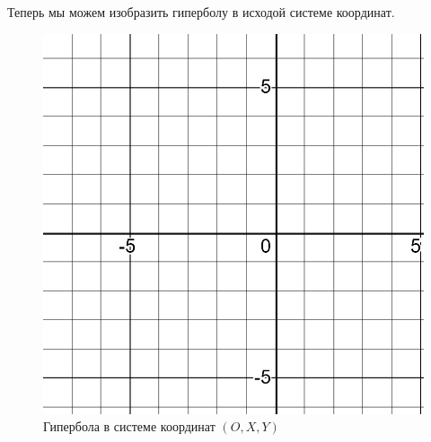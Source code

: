 \documentclass[12pt, a4paper]{article}
\begin{document}
    Теперь мы можем изобразить гиперболу в исходой системе координат.
    \begin{figure}[h!]
        \centering
        \includegraphics[width=\textwidth]{resources/1.7_grid_left.png}
        \caption{Гипербола в системе координат $(O, X, Y)$}
        \label{fig:grid_4}
    \end{figure}
    \FloatBarrier 
    
\end{document}
